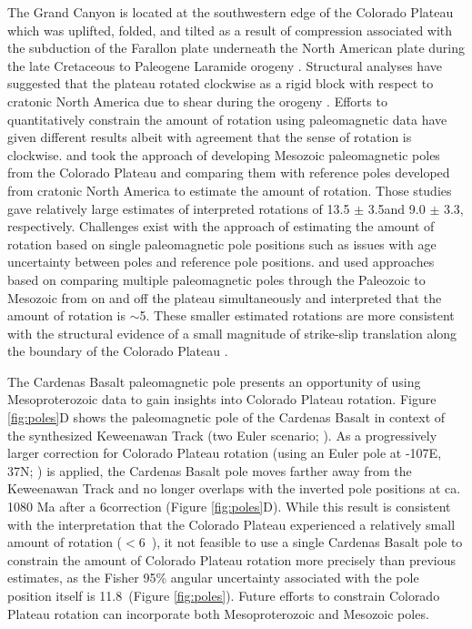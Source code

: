 The Grand Canyon is located at the southwestern edge of the Colorado Plateau which was uplifted, folded, and tilted as a result of compression associated with the subduction of the Farallon plate underneath the North American plate during the late Cretaceous to Paleogene Laramide orogeny \cite{Yonkee2015a, Karlstrom2012a, Timmons2012a, Karlstrom2022a}. Structural analyses have suggested that the plateau rotated clockwise as a rigid block with respect to cratonic North America due to shear during the orogeny \cite[e.g.][]{Hamilton1981a, Hamilton1988a}. Efforts to quantitatively constrain the amount of rotation using paleomagnetic data have given different results albeit with agreement that the sense of rotation is clockwise.  and  took the approach of developing Mesozoic paleomagnetic poles from the Colorado Plateau and comparing them with reference poles developed from cratonic North America to estimate the amount of rotation. Those studies gave relatively large estimates of interpreted rotations of 13.5 $\pm$ 3.5\textdegree and 9.0 $\pm$ 3.3\textdegree, respectively. Challenges exist with the approach of estimating the amount of rotation based on single paleomagnetic pole positions such as issues with age uncertainty between poles and reference pole positions.  and  used approaches based on comparing multiple paleomagnetic poles through the Paleozoic to Mesozoic from on and off the plateau simultaneously and interpreted that the amount of rotation is $\sim$5\textdegree. These smaller estimated rotations are more consistent with the structural evidence of a small magnitude of strike-slip translation along the boundary of the Colorado Plateau \cite[e.g.][]{Woodward1997a}. 

The Cardenas Basalt paleomagnetic pole presents an opportunity of using Mesoproterozoic data to gain insights into Colorado Plateau rotation. Figure \ref{fig:poles}D shows the paleomagnetic pole of the Cardenas Basalt in context of the synthesized Keweenawan Track (two Euler scenario; ). As a progressively larger correction for Colorado Plateau rotation (using an Euler pole at -107\textdegree E, 37\textdegree N; ) is applied, the Cardenas Basalt pole moves farther away from the Keweenawan Track and no longer overlaps with the inverted pole positions at ca. 1080 Ma after a 6\textdegree correction (Figure \ref{fig:poles}D). While this result is consistent with the interpretation that the Colorado Plateau experienced a relatively small amount of rotation ($<$6\textdegree\ ), it not feasible to use a single Cardenas Basalt pole to constrain the amount of Colorado Plateau rotation more precisely than previous estimates, as the Fisher 95\% angular uncertainty associated with the pole position itself is 11.8\textdegree\ (Figure \ref{fig:poles}). Future efforts to constrain Colorado Plateau rotation can incorporate both Mesoproterozoic and Mesozoic poles.

